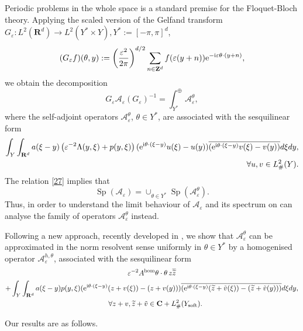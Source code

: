 \documentclass[11pt]{article}
\newcommand\e {\varepsilon}
\newcommand\soft{{\rm soft}}
\def\rme{{\rm e}}
\def\rmi{{\rm i}}
\newcommand{\R}{\mathbf{R}}
\def\C{\mathbf {C}}
\def\AA{\mathcal{A}}
\def\hom{{\rm hom}}
\DeclareMathOperator{\Sp}{Sp}
\newcommand\G{G}
\newcommand\A{\mathcal A}
\newcommand\Z{\mathbf{Z}}
\theoremstyle{remark}
\begin{document}
Periodic problems in the whole space is a standard premise for the Floquet-Bloch theory. Applying the scaled version of the Gelfand transform $\G_\e: L^2(\R^d) \to L^2(Y^*\times  Y ), Y^*:= [-\pi,\pi]^d $,
\begin{equation*}
	(\G_\e f)(\theta, y) := \left(\frac{\e^2}{2\pi}\right)^{d/2} \sum_{n\in \Z^d} f(\e(y+n)) \rme^{-\rmi  \e \theta\cdot(y+n)},
\end{equation*}
we obtain the decomposition
\begin{equation}\label{27}
	\G_\e \A_\e  (\G_\e)^{-1} = \int_{Y^*}^\oplus \A_\e^\theta,
\end{equation}
where the self-adjoint operators $\A_\e^\theta$, $\theta \in Y^*$, are associated with the sesquilinear form
\begin{equation*} %
	\begin{split}
		\int_{Y}\int_{\R^d} a(\xi - y) \left( \e^{-2}\Lambda(y,\xi) +  p(y,\xi)\right) (\rme^{\rmi \theta\cdot(\xi - y)} u(\xi)-u(y))  \overline{(\rme^{\rmi \theta\cdot(\xi - y)}v(\xi)-v(y))}d\xi dy,
		\\
		\quad \forall u, v\in   L^2_\#(Y).
	\end{split}
\end{equation*}
The relation \eqref{27} implies that
\begin{equation*}%
	\Sp (\AA_\e ) = \cup_{\theta\in Y^*} \Sp (\AA_\e^\theta).
\end{equation*}
Thus, in order to understand the limit behaviour of $\AA_\e$ and its spectrum on can analyse the family of operators $\AA_\e^\theta$ instead.

Following a new approach, recently developed in \cite{CKS2023}, we show that $\A_\e^\theta$ can be approximated in the norm resolvent sense uniformly in $\theta\in Y^*$ by a homogenised operator $\AA_\e^{h,\theta}$, associated with the sesquilinear form
\begin{multline} \label{28}
	\e^{-2}	A^\hom \theta \cdot \theta \, z \overline{\widetilde z}
	\\
	+	\int_{Y}\int_{\R^d} a(\xi - y)  p(y,\xi) (\rme^{\rmi \theta\cdot(\xi - y)} (z+v(\xi))-(z+v(y)))
	\overline{(\rme^{\rmi \theta\cdot(\xi - y)}(\widetilde z+\tilde v(\xi))-(\widetilde z+\tilde v(y)))}d\xi dy,
	\\
	\quad \forall z+v, \widetilde z+\tilde v \in   \C+ L^2_\#(Y_\soft).
\end{multline}

Our results are as follows.
\end{document}

